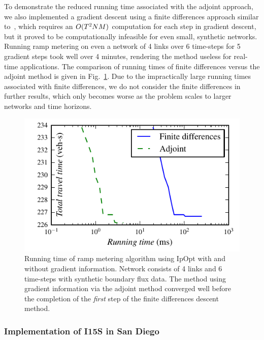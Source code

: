 \begin{note} To demonstrate the reduced running time associated with the adjoint approach, we also implemented a gradient descent using a finite differences approach similar to~\cite{Frejo2011,Ramon2013}, which requires an $O(T^2NM)$ computation for each step in gradient descent, but it proved to be computationally infeasible for even small, synthetic
networks. Running ramp metering on even a network of 4 links over
6 time-steps for 5 gradient steps took well over 4 minutes,
rendering the method useless for real-time applications. The comparison
of running times of finite differences versus the adjoint method is given in
Fig.~\ref{fig:Running-time-of}. Due to the impractically large running times associated with finite differences, we do not consider the finite differences in further results, which only becomes worse as the problem scales to larger networks and time horizons.
\end{note}
\begin{figure}[h]
\centering%
\includegraphics[width=0.5\columnwidth]{previous-articles/adjoint/images/itergrad}%
\caption[Running time of ramp metering algorithm using IpOpt with and without gradient information.]{Running time of ramp metering algorithm using IpOpt with and without gradient information.
Network consists of 4 links and 6 time-steps with synthetic boundary
flux data. The method using gradient information via the adjoint
method converged well before the completion of the \textit{first} step of the finite differences descent method.
}%
\label{fig:Running-time-of}
\end{figure}



\subsubsection{Implementation of I15S in San Diego\label{sub:Network}}

